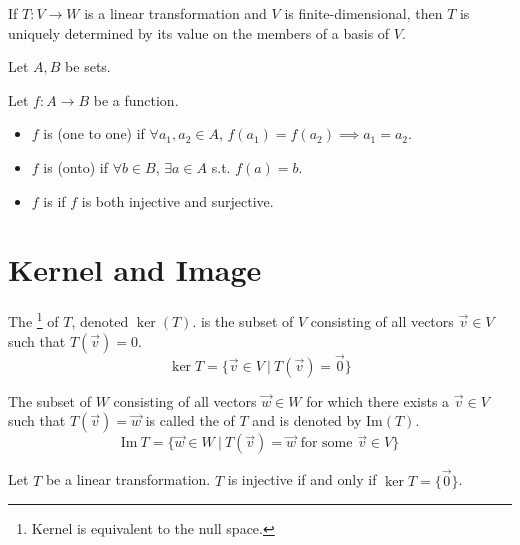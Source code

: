 \documentclass[11pt,fleqn]{book} %
\begin{document}
\setcounter{dummy}{13}
\begin{proposition}
    If $T: V \to W$ is a linear transformation and $V$ is finite-dimensional, then $T$ is uniquely determined by its value on the members of a basis of $V$.
\end{proposition}

\setcounter{section}{0}
\begin{definition}
    Let $A, B$ be sets.

    Let $f: A \to B$ be a function.

    \begin{itemize}
        \item $f$ is  (one to one) if $\forall a_1, a_2 \in A$, $f(a_1) = f(a_2) \implies a_1 = a_2$.

        \item $f$ is  (onto) if $\forall b \in B$, $\exists a \in A$ s.t. $f(a) = b$.

        \item $f$ is  if $f$ is both injective and surjective.
    \end{itemize}
\end{definition}
\setcounter{section}{1}

\section{Kernel and Image}

\setcounter{section}{3}
\begin{definition}[Kernel]
    The \footnote{Kernel is equivalent to the null space. } of $T$, denoted $\ker(T)$. is the subset of $V$ consisting of all vectors $\vec{v} \in V$ such that $T(\vec{v}) = 0$. $$\ker T=\{ \vec{v} \in V ~|~ T(\vec{v}) = \vec{0} \}$$
\end{definition}

\setcounter{definitionT}{9}
\begin{definition}[Image]
    The subset of $W$ consisting of all vectors $\vec{w} \in W$ for which there exists a $\vec{v} \in V$ such that $T(\vec{v}) = \vec{w}$ is called the  of $T$ and is denoted by $\mathrm{Im}(T)$. $$\mathrm{Im}~T = \{ \vec{w} \in W ~|~ T(\vec{v}) = \vec{w} \text{ for some } \vec{v} \in V \}$$
\end{definition}

\setcounter{section}{0}
\setcounter{dummy}{2}
\begin{proposition}
    Let $T$ be a linear transformation. $T$ is injective if and only if $\ker T = \{ \vec{0} \}$.
\end{proposition}
\end{document}
